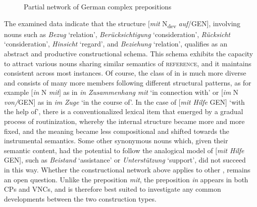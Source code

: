 \documentclass[output=paper,colorlinks,citecolor=brown]{langscibook}
\begin{document}
\begin{figure}
\centering
{}
\caption{Partial network of German complex prepositions \citep{Ruffthc}}
\label{fig:fleissner:3}
\end{figure}

The examined data indicate that the structure [\textit{mit} N\textsubscript{dev} \textit{auf}/GEN], involving nouns such as \textit{Bezug} `relation', \textit{Berücksichtigung} `consideration', \textit{Rücksicht} `consideration', \textit{Hinsicht} `regard', and \textit{Beziehung} ‘relation', qualifies as an abstract and productive constructional schema. This schema exhibits the capacity to attract various nouns sharing similar semantics of \textsc{reference}, and it maintains consistent across most instances. Of course, the class of  in  is much more diverse and consists of many more members following different structural patterns, as for example [\textit{in} N \textit{mit}] as in \textit{in Zusammenhang mit} ‘in connection with' or [\textit{im} N \textit{von/}GEN] as in \textit{im Zuge} ‘in the course of'. In the case of [\textit{mit Hilfe} GEN] ‘with the help of', there is a conventionalized lexical item that emerged by a gradual process of routinization, whereby the internal structure became more and more fixed, and the meaning became less compositional and shifted towards the instrumental semantics. Some other synonymous nouns which, given their semantic content, had the potential to follow the analogical model of [\textit{mit Hilfe} GEN], such as \textit{Beistand} ‘assistance' or \textit{Unterstützung} ‘support', did not succeed in this way. Whether the constructional network above applies to other , remains an open question. Unlike the preposition \textit{mit}, the preposition \textit{in} appears in both CPs and VNCs, and is therefore best suited to investigate any common developments between the two construction types. 
\end{document}
